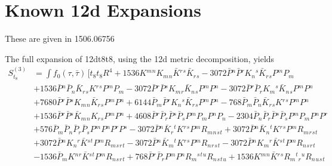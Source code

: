 \section{Known 12d Expansions}

These are given in 1506.06756

The full expansion of 12dt8t8, using the 12d metric decomposition, yields
\begin{align}
S^{(3)}_{t_8} &= \int f_0(\tau,\bar{\tau})\, \bigg [  t_8 t_8 R^4
  + 1536 K{}^{m}{}^{n} K{}_{m}{}_{n} \bar{K}{}^{r}{}^{s} \bar{K}{}_{r}{}_{s}
  - 3072 \bar{P}{}^{n} \bar{P}{}^{r} K{}_{n}{}^{s} \bar{K}{}_{r}{}_{s} P{}^{m} P{}_{m}
\nonumber \\ &
  + 1536 \bar{P}{}^{n} \bar{P}{}_{n} \bar{K}{}_{r}{}_{s} K{}^{r}{}^{s} P{}^{m} P{}_{m}
  - 3072 \bar{P}{}^{r} \bar{P}{}^{s} K{}_{m}{}_{r} \bar{K}{}_{n}{}_{s} P{}^{m} P{}^{n}
  - 3072 \bar{P}{}^{r} \bar{P}{}_{r} K{}_{m}{}^{s} \bar{K}{}_{n}{}_{s} P{}^{m} P{}^{n}
\nonumber \\ &
  + 7680 \bar{P}{}^{r} \bar{P}{}^{s} K{}_{m}{}_{n} \bar{K}{}_{r}{}_{s} P{}^{m} P{}^{n}
  + 6144 \bar{P}{}_{m} \bar{P}{}^{r} K{}_{n}{}^{s} \bar{K}{}_{r}{}_{s} P{}^{m} P{}^{n}
  - 768 \bar{P}{}_{m} \bar{P}{}_{n} \bar{K}{}_{r}{}_{s} K{}^{r}{}^{s} P{}^{m} P{}^{n}
\nonumber \\ &
  + 1536 \bar{P}{}^{r} \bar{P}{}^{s} \bar{K}{}_{m}{}_{n} K{}_{r}{}_{s} P{}^{m} P{}^{n}
  + 4608 \bar{P}{}^{r} \bar{P}{}_{r} \bar{P}{}^{s} \bar{P}{}_{s} P{}^{m} P{}_{m} P{}^{n} P{}_{n}
  - 2304 \bar{P}{}_{n} \bar{P}{}_{r} \bar{P}{}^{s} \bar{P}{}_{s} P{}^{m} P{}_{m} P{}^{n} P{}^{r}
\nonumber \\ &
  + 576 \bar{P}{}_{m} \bar{P}{}_{n} \bar{P}{}_{r} \bar{P}{}_{s} P{}^{m} P{}^{n} P{}^{r} P{}^{s}
  - 3072 \bar{P}{}^{n} \bar{K}{}_{r}{}^{t} K{}^{r}{}^{s} P{}^{m} R{}_{m}{}_{n}{}_{s}{}_{t}
  + 3072 \bar{P}{}^{n} \bar{K}{}_{n}{}^{t} K{}^{r}{}^{s} P{}^{m} R{}_{m}{}_{r}{}_{s}{}_{t}
\nonumber \\ &
  + 3072 \bar{P}{}^{n} K{}_{n}{}^{r} \bar{K}{}^{s}{}^{t} P{}^{m} R{}_{m}{}_{s}{}_{r}{}_{t}
  - 3072 \bar{P}{}^{n} \bar{K}{}_{m}{}^{t} K{}^{r}{}^{s} P{}^{m} R{}_{n}{}_{r}{}_{s}{}_{t}
  - 3072 \bar{P}{}^{n} K{}_{m}{}^{r} \bar{K}{}^{s}{}^{t} P{}^{m} R{}_{n}{}_{s}{}_{r}{}_{t}
\nonumber \\ &
  - 1536 \bar{P}{}_{m} K{}^{n}{}^{r} \bar{K}{}^{s}{}^{t} P{}^{m} R{}_{n}{}_{s}{}_{r}{}_{t}
  + 768 \bar{P}{}^{r} \bar{P}{}_{r} P{}^{m} P{}^{n} R{}_{m}{}^{s}{}^{t}{}^{u} R{}_{n}{}_{s}{}_{t}{}_{u}
  + 1536 K{}^{m}{}^{n} \bar{K}{}^{r}{}^{s} R{}_{m}{}^{t}{}_{r}{}^{u} R{}_{n}{}_{u}{}_{s}{}_{t}

\end{align}
